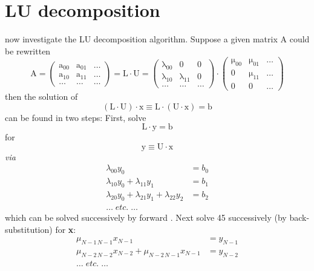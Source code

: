 \section{LU decomposition}
 now investigate the LU decomposition algorithm. Suppose a given matrix A could be rewritten
\begin{equation}
    \label{eq:09_42}
    \mathrm{
    A = 
    \begin{pmatrix}
        a_{00}&a_{01} &\dots\\
        a_{10}&a_{11} &\dots\\
        \dots&\dots &\dots
    \end{pmatrix}
    = L \cdot U =
    \begin{pmatrix}
        \lambda_{00}&0 &0\\
        \lambda_{10}&\lambda_{11} &0\\
        \dots&\dots &\dots
    \end{pmatrix}
    \cdot
    \begin{pmatrix}
        \mu_{00}&\mu_{01} &\dots\\
        0&\mu_{11} &\dots\\
        0&0 &\dots
    \end{pmatrix}
}
\end{equation} 
then the solution of
\begin{equation}
    \label{eq:09_43}
    \mathrm{(L \cdot U ) \cdot x \equiv L \cdot (U \cdot x) = b}
\end{equation} 
can be found in two steps: First, solve
\begin{equation}
    \label{eq:09_44}
    \mathrm{L \cdot y = b}
\end{equation} 
for
\begin{equation}
    \label{eq:09_45}
    \mathrm{y \equiv U  \cdot x}
\end{equation} 
\textit{via}
\begin{align}
    \label{eq:09_46}
    \lambda_{00} y_0 &= b_0 \nonumber \\
    \lambda_{10} y_0 + \lambda_{11} y_1 &= b_1 \\
    \lambda_{20} y_0 + \lambda_{21} y_1 + \lambda_{22} y_2 &= b_2 \nonumber \\
    \dots \;\textit{etc.} \;\dots \nonumber
\end{align}
which can be solved successively by forward . Next
solve 45 successively (by back-substitution) for \textbf{x}:
\begin{align}
    \label{eq:09_47}
    \mu_{N-1\, N-1} x_{N-1} &= y_{N-1} \nonumber \\
    \mu_{N-2\, N-2} x_{N-2} + \mu_{N-2\, N-1} x_{N-1} &= y_{N-2} \\
    \dots \;\textit{etc.} \;\dots \nonumber
\end{align}
